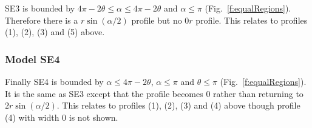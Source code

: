 SE3 is bounded by $4\pi - 2\theta \le \alpha \le 4\pi - 2\theta$ and $\alpha \le \pi$ (Fig.~\ref{f:equalRegions}). Therefore there is a $r\sin(\alpha/2)$ profile but no $0r$ profile. This relates to profiles (1), (2), (3) and (5) above.



\subsubsection{Model SE4} \label{SE4}

Finally SE4 is bounded by  $\alpha \le 4\pi - 2\theta $, $\alpha\le\pi$ and $\theta \le \pi$ (Fig.~\ref{f:equalRegions}). It is the same as SE3 except that the profile becomes 0 rather than returning to $2r\sin(\alpha/2)$. This relates to profiles (1), (2), (3) and (4) above though profile (4) with width 0 is not shown.




